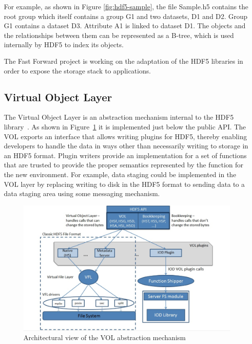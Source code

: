 \documentclass[conference]{IEEEtran}
\begin{document}
For example, as shown in Figure \ref{fig:hdf5-sample}, the file Sample.h5
contains the root group which itself contains a group G1 and two datasets, D1
and D2. Group G1 contains a dataset D3. Attribute A1 is linked to dataset D1.
The objects and the relationships between them can be represented as a B-tree,
which is used internally by HDF5 to index its objects.

The Fast Forward project is working on the adaptation of the HDF5 libraries in
order to expose the storage stack to applications.

\subsection{Virtual Object Layer}
\label{virtual-object-layer}

The Virtual Object Layer is an abstraction mechanism internal to the HDF5
library~\cite{hdf5}. As shown in Figure~\ref{fig:vol-arch} it is implemented
just below the public API. The VOL exports an interface that allows writing
plugins for HDF5, thereby enabling developers to handle the data in ways other
than necessarily writing to storage in an HDF5 format.  Plugin writers provide
an implementation for a set of functions that are trusted to provide the
proper semantics represented by the function for the new environment. For
example, data staging could be implemented in the VOL layer by replacing
writing to disk in the HDF5 format to sending data to a data staging area using
some messaging mechanism.

\begin{figure}[htbp]
\centering
\includegraphics[scale=0.20]{images/vol-arch.png}
\caption{Architectural view of the VOL abstraction mechanism}
\label{fig:vol-arch}
\end{figure}
\end{document}

